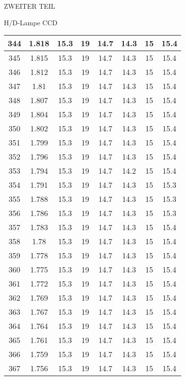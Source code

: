 \begin{appendix}
\begin{chapter}{ZWEITER TEIL}
\begin{section}{H/D-Lampe CCD}
\begin{scriptsize}
\begin{longtable}[htbp]{|c|c|c|c|c|c|c|c|}
            344 & 1.818 & 15.3 & 19 & 14.7 & 14.3 & 15 & 15.4 \\ \hline
            345 & 1.815 & 15.3 & 19 & 14.7 & 14.3 & 15 & 15.4 \\ \hline
            346 & 1.812 & 15.3 & 19 & 14.7 & 14.3 & 15 & 15.4 \\ \hline
            347 & 1.81 & 15.3 & 19 & 14.7 & 14.3 & 15 & 15.4 \\ \hline
            348 & 1.807 & 15.3 & 19 & 14.7 & 14.3 & 15 & 15.4 \\ \hline
            349 & 1.804 & 15.3 & 19 & 14.7 & 14.3 & 15 & 15.4 \\ \hline
            350 & 1.802 & 15.3 & 19 & 14.7 & 14.3 & 15 & 15.4 \\ \hline
            351 & 1.799 & 15.3 & 19 & 14.7 & 14.3 & 15 & 15.4 \\ \hline
            352 & 1.796 & 15.3 & 19 & 14.7 & 14.3 & 15 & 15.4 \\ \hline
            353 & 1.794 & 15.3 & 19 & 14.7 & 14.2 & 15 & 15.4 \\ \hline
            354 & 1.791 & 15.3 & 19 & 14.7 & 14.3 & 15 & 15.3 \\ \hline
            355 & 1.788 & 15.3 & 19 & 14.7 & 14.3 & 15 & 15.3 \\ \hline
            356 & 1.786 & 15.3 & 19 & 14.7 & 14.3 & 15 & 15.3 \\ \hline
            357 & 1.783 & 15.3 & 19 & 14.7 & 14.3 & 15 & 15.4 \\ \hline
            358 & 1.78 & 15.3 & 19 & 14.7 & 14.3 & 15 & 15.4 \\ \hline
            359 & 1.778 & 15.3 & 19 & 14.7 & 14.3 & 15 & 15.4 \\ \hline
            360 & 1.775 & 15.3 & 19 & 14.7 & 14.3 & 15 & 15.4 \\ \hline
            361 & 1.772 & 15.3 & 19 & 14.7 & 14.3 & 15 & 15.4 \\ \hline
            362 & 1.769 & 15.3 & 19 & 14.7 & 14.3 & 15 & 15.4 \\ \hline
            363 & 1.767 & 15.3 & 19 & 14.7 & 14.3 & 15 & 15.4 \\ \hline
            364 & 1.764 & 15.3 & 19 & 14.7 & 14.3 & 15 & 15.4 \\ \hline
            365 & 1.761 & 15.3 & 19 & 14.7 & 14.3 & 15 & 15.4 \\ \hline
            366 & 1.759 & 15.3 & 19 & 14.7 & 14.3 & 15 & 15.4 \\ \hline
            367 & 1.756 & 15.3 & 19 & 14.7 & 14.3 & 15 & 15.4 \\ \hline

\end{longtable}
\end{scriptsize}
\end{section}
\end{chapter}
\end{appendix}
